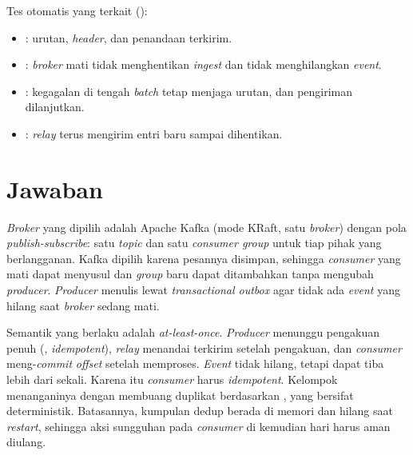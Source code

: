 Tes otomatis yang terkait ():
\begin{itemize}
 \item {}: urutan, \emph{header}, dan penandaan terkirim.
 \item {}: \emph{broker} mati tidak menghentikan \emph{ingest} dan tidak menghilangkan \emph{event}.
 \item {}: kegagalan di tengah \emph{batch} tetap menjaga urutan, dan pengiriman dilanjutkan.
 \item {}: \emph{relay} terus mengirim entri baru sampai dihentikan.
\end{itemize}

\section{Jawaban}

\begin{jawaban}
\emph{Broker} yang dipilih adalah Apache Kafka (mode KRaft, satu \emph{broker}) dengan pola \emph{publish-subscribe}: satu
\emph{topic}  dan satu \emph{consumer group} untuk tiap pihak yang berlangganan. Kafka dipilih karena pesannya
disimpan, sehingga \emph{consumer} yang mati dapat menyusul dan \emph{group} baru dapat ditambahkan tanpa mengubah \emph{producer}. \emph{Producer}
menulis lewat \emph{transactional outbox} agar tidak ada \emph{event} yang hilang saat \emph{broker} sedang mati.
\end{jawaban}

\begin{jawaban}
Semantik yang berlaku adalah \emph{at-least-once}. \emph{Producer} menunggu pengakuan penuh (, \emph{idempotent}),
\emph{relay} menandai terkirim setelah pengakuan, dan \emph{consumer} meng-\emph{commit} \emph{offset} setelah memproses. \emph{Event} tidak hilang, tetapi
dapat tiba lebih dari sekali. Karena itu \emph{consumer} harus \emph{idempotent}. Kelompok menanganinya dengan membuang
duplikat berdasarkan , yang bersifat deterministik. Batasannya, kumpulan dedup berada
di memori dan hilang saat \emph{restart}, sehingga aksi sungguhan pada \emph{consumer} di kemudian hari harus aman diulang.
\end{jawaban}
